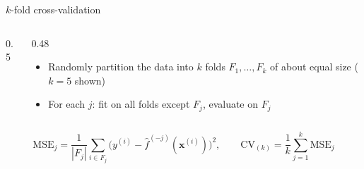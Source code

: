 \begin{frame}{$k$-fold cross-validation}
    \begin{columns}[T]
        \begin{column}{0.5\textwidth}
            \begin{center}
            \end{center}
        \end{column}
        \begin{column}{0.48\textwidth}
            \begin{itemize}
                \item Randomly partition the data into $k$ folds $F_1, \dots, F_k$ of about equal size ($k = 5$ shown)
                \item For each $j$: fit on all folds except $F_j$, evaluate on $F_j$
            \end{itemize}
        \end{column}
    \end{columns}
    \[
        \mathrm{MSE}_j = \frac{1}{|F_j|}\sum_{i \in F_j}\big(y^{(i)} - \hat{f}^{(-j)}(\mathbf{x}^{(i)})\big)^2,
        \qquad
        \mathrm{CV}_{(k)} = \frac{1}{k}\sum_{j=1}^{k}\mathrm{MSE}_j
    \]
\end{frame}



